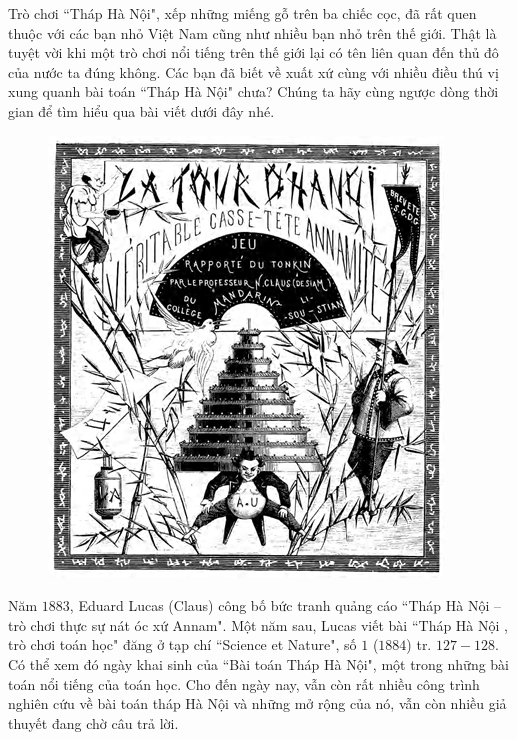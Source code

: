 \begin{multicols}{2}
	Trò chơi ``Tháp Hà Nội", xếp những miếng gỗ trên ba chiếc cọc, đã rất quen thuộc với các bạn nhỏ Việt Nam cũng như nhiều bạn nhỏ trên thế giới. Thật là tuyệt vời khi một trò chơi nổi tiếng trên thế giới lại có tên liên quan đến thủ đô của nước ta đúng không. Các bạn đã biết về xuất xứ cùng với nhiều điều thú vị xung quanh bài toán ``Tháp Hà Nội" chưa? Chúng ta hãy cùng ngược dòng thời gian để tìm hiểu qua bài viết dưới đây nhé.
	\begin{figure}[H]
		\centering
		\vspace*{-5pt}
		\captionsetup{labelformat= empty, justification=centering}
		\includegraphics[width=1\linewidth]{1.1}
		\vspace*{-15pt}
	\end{figure}
	Năm $1883$, Eduard Lucas (Claus) công bố  bức tranh quảng cáo ``Tháp Hà Nội --  trò chơi thực sự nát óc xứ Annam".
	\vskip 0.1cm
	Một năm sau, Lucas viết bài ``Tháp Hà Nội , trò chơi toán học" đăng ở tạp chí ``Science et Nature", số $1$ ($1884$) tr. $127-128$. Có thể xem đó ngày khai sinh của ``Bài toán Tháp Hà Nội", một trong những bài toán nổi tiếng của toán học. Cho đến ngày nay, vẫn còn rất nhiều công trình nghiên cứu về bài toán tháp Hà Nội và những mở rộng của nó, vẫn còn nhiều giả thuyết đang chờ câu trả lời.

\end{multicols}
